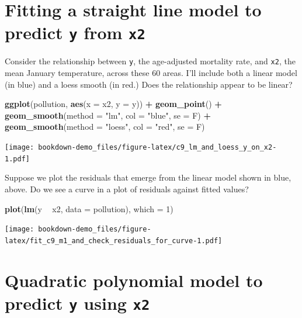 \documentclass[]{book}
\newenvironment{Shaded}{\begin{snugshade}}{\end{snugshade}}
\newcommand{\KeywordTok}[1]{\textcolor[rgb]{0.13,0.29,0.53}{\textbf{#1}}}
\newcommand{\DataTypeTok}[1]{\textcolor[rgb]{0.13,0.29,0.53}{#1}}
\newcommand{\DecValTok}[1]{\textcolor[rgb]{0.00,0.00,0.81}{#1}}
\newcommand{\StringTok}[1]{\textcolor[rgb]{0.31,0.60,0.02}{#1}}
\newcommand{\OperatorTok}[1]{\textcolor[rgb]{0.81,0.36,0.00}{\textbf{#1}}}
\newcommand{\NormalTok}[1]{#1}
\theoremstyle{definition}
\theoremstyle{definition}
\theoremstyle{definition}
\theoremstyle{remark}
\begin{document}
\section{\texorpdfstring{Fitting a straight line model to predict
\texttt{y} from
\texttt{x2}}{Fitting a straight line model to predict y from x2}}\label{fitting-a-straight-line-model-to-predict-y-from-x2}

Consider the relationship between \texttt{y}, the age-adjusted mortality
rate, and \texttt{x2}, the mean January temperature, across these 60
areas. I'll include both a linear model (in blue) and a loess smooth (in
red.) Does the relationship appear to be linear?

\begin{Shaded}
\begin{Highlighting}[]
\KeywordTok{ggplot}\NormalTok{(pollution, }\KeywordTok{aes}\NormalTok{(}\DataTypeTok{x =}\NormalTok{ x2, }\DataTypeTok{y =}\NormalTok{ y)) }\OperatorTok{+}
\StringTok{    }\KeywordTok{geom_point}\NormalTok{() }\OperatorTok{+}
\StringTok{    }\KeywordTok{geom_smooth}\NormalTok{(}\DataTypeTok{method =} \StringTok{"lm"}\NormalTok{, }\DataTypeTok{col =} \StringTok{"blue"}\NormalTok{, }\DataTypeTok{se =}\NormalTok{ F) }\OperatorTok{+}
\StringTok{    }\KeywordTok{geom_smooth}\NormalTok{(}\DataTypeTok{method =} \StringTok{"loess"}\NormalTok{, }\DataTypeTok{col =} \StringTok{"red"}\NormalTok{, }\DataTypeTok{se =}\NormalTok{ F)}
\end{Highlighting}
\end{Shaded}

\texttt{[image: bookdown-demo\_files/figure-latex/c9\_lm\_and\_loess\_y\_on\_x2-1.pdf]}

Suppose we plot the residuals that emerge from the linear model shown in
blue, above. Do we see a curve in a plot of residuals against fitted
values?

\begin{Shaded}
\begin{Highlighting}[]
\KeywordTok{plot}\NormalTok{(}\KeywordTok{lm}\NormalTok{(y }\OperatorTok{~}\StringTok{ }\NormalTok{x2, }\DataTypeTok{data =}\NormalTok{ pollution), }\DataTypeTok{which =} \DecValTok{1}\NormalTok{)}
\end{Highlighting}
\end{Shaded}

\texttt{[image: bookdown-demo\_files/figure-latex/fit\_c9\_m1\_and\_check\_residuals\_for\_curve-1.pdf]}

\section{\texorpdfstring{Quadratic polynomial model to predict
\texttt{y} using
\texttt{x2}}{Quadratic polynomial model to predict y using x2}}\label{quadratic-polynomial-model-to-predict-y-using-x2}
\end{document}
